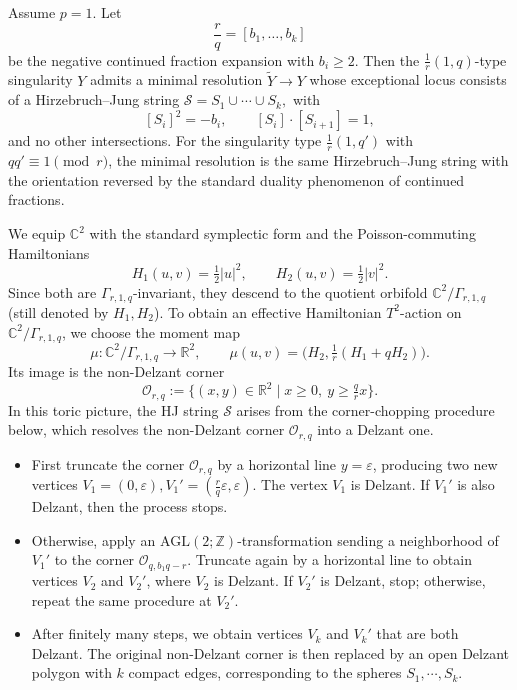 \documentclass[11pt]{article}
\theoremstyle{definition}
\theoremstyle{remark}
\newcommand{\Z}{\mathbb{Z}}
\newcommand{\R}{\mathbb{R}}
\newcommand{\C}{\mathbb{C}}
\newcommand{\st}{\mathcal{S}}
\begin{document}
Assume $p=1$. Let
\[
\frac{r}{q} = [b_1,\dots,b_k]
\]
be the negative continued fraction expansion with $b_i\ge 2$. Then the $\frac{1}{r}(1,q)$-type singularity $Y$ admits a minimal resolution $\tilde{Y}\rightarrow Y$ whose exceptional locus consists of a Hirzebruch--Jung string
\(
\st=S_1 \cup \cdots \cup S_k,
\)
with
\[
[S_i]^2 = -b_i, \qquad [S_i]\cdot [S_{i+1}]=1,
\]
and no other intersections. For the singularity type $\frac{1}{r}(1,q')$ with $qq'\equiv 1\pmod r$, the minimal resolution is the same Hirzebruch--Jung string with the orientation reversed by the standard duality phenomenon of continued fractions.

We equip $\C^2$ with the standard symplectic form and the Poisson-commuting Hamiltonians
\[
H_1(u,v)=\tfrac12|u|^2,
\qquad
H_2(u,v)=\tfrac12|v|^2.
\]
Since both are $\Gamma_{r,1,q}$-invariant, they descend to the quotient orbifold $\C^2/\Gamma_{r,1,q}$ (still denoted by $H_1,H_2$). To obtain an effective Hamiltonian $T^2$-action on $\C^2/\Gamma_{r,1,q}$, we choose the moment map
\[
\mu:\C^2/\Gamma_{r,1,q}\to \R^2,
\qquad
\mu(u,v)=\bigl(H_2,\tfrac1r(H_1+qH_2)\bigr).
\]
Its image is the non-Delzant corner
\[
\mathcal{O}_{r,q}:=\{(x,y)\in\R^2\mid x\ge 0,\ y\ge \tfrac{q}{r}x\}.
\]
In this toric picture, the HJ string $\st$ arises from the corner-chopping procedure below, which resolves the non-Delzant corner $\mathcal{O}_{r,q}$ into a Delzant one.
\begin{itemize}[nosep]
  \item First truncate the corner $\mathcal{O}_{r,q}$ by a horizontal line $y=\varepsilon$, producing two new vertices
  \(
    V_1=(0,\varepsilon), V_1'=(\frac{r}{q}\varepsilon,\varepsilon).
  \)
  The vertex $V_1$ is Delzant. If $V_1'$ is also Delzant, then the process stops.
  \item Otherwise, apply an $\text{AGL}(2;\Z)$-transformation sending a neighborhood of $V_1'$ to the corner $\mathcal{O}_{q,b_1q-r}$. Truncate again by a horizontal line to obtain vertices $V_2$ and $V_2'$, where $V_2$ is Delzant. If $V_2'$ is Delzant, stop; otherwise, repeat the same procedure at $V_2'$.
  \item After finitely many steps, we obtain vertices $V_k$ and $V_k'$ that are both Delzant. The original non-Delzant corner is then replaced by an open Delzant polygon with $k$ compact edges, corresponding to the spheres $S_1,\cdots,S_k$.
\end{itemize}
\end{document}
